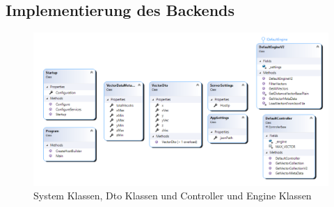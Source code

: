 %	
%		
%		
%	
%	


\FloatBarrier
\subsection{Implementierung des Backends}

\begin{figure}[H]
	\centering
	\includegraphics[width=\linewidth]{images/backend/classDiagram}
	\caption{System Klassen, Dto Klassen und Controller und Engine Klassen}
	\label{fig:ClassDiagram}
\end{figure}

